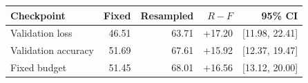 \begin{tabular}{lrrrr}
\toprule
Checkpoint & Fixed & Resampled & $R-F$ & 95\% CI \\
\midrule
Validation loss & 46.51 & 63.71 & +17.20 & [11.98, 22.41] \\
Validation accuracy & 51.69 & 67.61 & +15.92 & [12.37, 19.47] \\
Fixed budget & 51.45 & 68.01 & +16.56 & [13.12, 20.00] \\
\bottomrule
\end{tabular}
